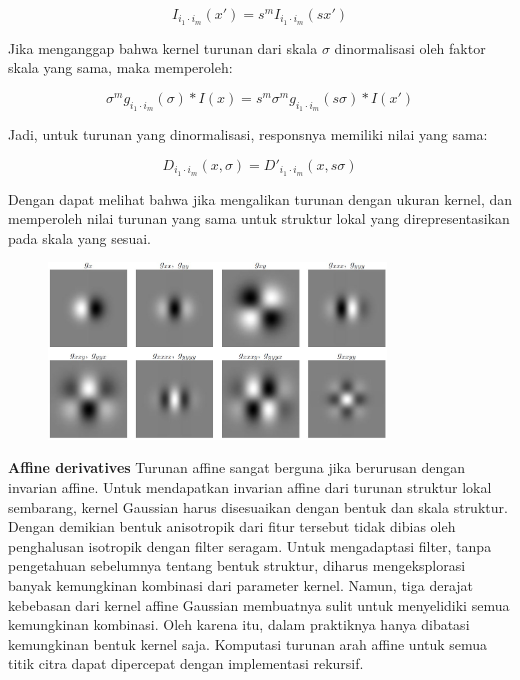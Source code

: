 \begin{equation*}
  I_{i_{1}\cdot i_{m}}(x') = s^{m}I_{i_{1}\cdot i_{m}}(sx')
\end{equation*}

Jika menganggap bahwa kernel turunan dari skala \(\sigma\) dinormalisasi oleh 
faktor skala yang sama, maka memperoleh:

\begin{equation*}
  \sigma^{m}g_{i_{1}\cdot i_{m}}(\sigma) * I(x)= s^{m}\sigma^{m}g_{i_{1}\cdot i_{m}}(s\sigma)*I(x')
\end{equation*}

Jadi, untuk turunan yang dinormalisasi, responsnya memiliki nilai yang sama:

\begin{equation*}
  D_{i_{1}\cdot i_{m}}(x,\sigma) = D'_{i_{1}\cdot i_{m}}(x,s\sigma)
\end{equation*}

Dengan dapat melihat bahwa jika mengalikan turunan dengan ukuran kernel, 
dan memperoleh nilai turunan yang sama untuk struktur lokal yang direpresentasikan 
pada skala yang sesuai.

\begin{figure}
  \centering{}
  \includegraphics[width=0.8\textwidth]{gambar/Uniform Gaussian derivatives.jpg}
  \caption{}
\end{figure}

\textbf{Affine derivatives} Turunan affine sangat berguna jika berurusan dengan 
invarian affine. Untuk mendapatkan invarian affine dari turunan struktur lokal sembarang, 
kernel Gaussian harus disesuaikan dengan bentuk dan skala struktur. Dengan demikian bentuk 
anisotropik dari fitur tersebut tidak dibias oleh penghalusan isotropik dengan filter seragam. 
Untuk mengadaptasi filter, tanpa pengetahuan sebelumnya tentang bentuk struktur, diharus 
mengeksplorasi banyak kemungkinan kombinasi dari parameter kernel. Namun, tiga derajat kebebasan 
dari kernel affine Gaussian membuatnya sulit untuk menyelidiki semua kemungkinan kombinasi. 
Oleh karena itu, dalam praktiknya hanya dibatasi kemungkinan bentuk kernel saja. 
Komputasi turunan arah affine untuk semua titik citra dapat dipercepat dengan implementasi rekursif. 

